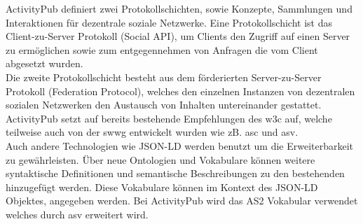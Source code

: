 {		ActivityPub definiert zwei Protokollschichten, sowie Konzepte, Sammlungen und Interaktionen für dezentrale soziale Netzwerke. Eine Protokollschicht ist das Client-zu-Server Protokoll (Social API), um Clients den Zugriff auf einen Server zu ermöglichen sowie zum entgegennehmen von Anfragen die vom Client abgesetzt wurden\cite{activityPub}.\\ 
		
		Die zweite Protokollschicht besteht aus dem förderierten Server-zu-Server Protokoll (Federation Protocol), welches den einzelnen Instanzen von dezentralen sozialen Netzwerken den Austausch von Inhalten untereinander gestattet. ActivityPub setzt auf bereits bestehende Empfehlungen des \gls{w3c} auf, welche teilweise auch von der \gls{swwg} entwickelt wurden wie zB. \gls{asc} und \gls{asv}\cite{activityPub}.\\
		
		Auch andere Technologien wie \gls{JSON-LD} werden benutzt um die Erweiterbarkeit zu gewährleisten. Über neue Ontologien und Vokabulare können weitere syntaktische Definitionen und semantische Beschreibungen zu den bestehenden hinzugefügt werden\cite{activityPub}. Diese Vokabulare können im Kontext des \gls{JSON-LD} Objektes, angegeben werden. Bei ActivityPub wird das \gls{AS2} Vokabular verwendet welches durch \gls{asv} erweitert wird.
	}
